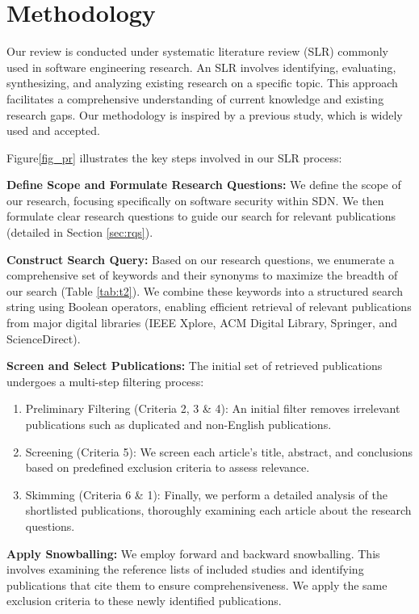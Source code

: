 \section{Methodology}\label{sec:meth}
Our review is conducted under systematic literature review (SLR) commonly used in software engineering research\citep{ref1}. An SLR involves identifying, evaluating, synthesizing, and analyzing existing research on a specific topic. This approach facilitates a comprehensive understanding of current knowledge and existing research gaps. Our methodology is inspired by a previous study\citep{ref2}, which is widely used and accepted.

Figure\ref{fig_pr} illustrates the key steps involved in our SLR process:
\begin{list}{}{}
\item{\textbf{Define Scope and Formulate Research Questions:} We define the scope of our research, focusing specifically on software security within SDN. We then formulate clear research questions to guide our search for relevant publications (detailed in Section \ref{sec:rqs}).}
\item{\textbf{Construct Search Query:} Based on our research questions, we enumerate a comprehensive set of keywords and their synonyms to maximize the breadth of our search (Table \ref{tab:t2}). We combine these keywords into a structured search string using Boolean operators, enabling efficient retrieval of relevant publications from major digital libraries (IEEE Xplore, ACM Digital Library, Springer, and ScienceDirect).}
\item{\textbf{Screen and Select Publications:} The initial set of retrieved publications undergoes a multi-step filtering process:
\begin{enumerate}
    \item Preliminary Filtering (Criteria 2, 3 \& 4): An initial filter removes irrelevant publications such as duplicated and non-English publications. 
    \item Screening (Criteria 5): We screen each article's title, abstract, and conclusions based on predefined exclusion criteria to assess relevance.
    \item Skimming (Criteria 6 \& 1): Finally, we perform a detailed analysis of the shortlisted publications, thoroughly examining each article about the research questions.
\end{enumerate}}
\item{\textbf{Apply Snowballing:} We employ forward and backward snowballing. This involves examining the reference lists of included studies and identifying publications that cite them to ensure comprehensiveness. We apply the same exclusion criteria to these newly identified publications.}

\end{list}
